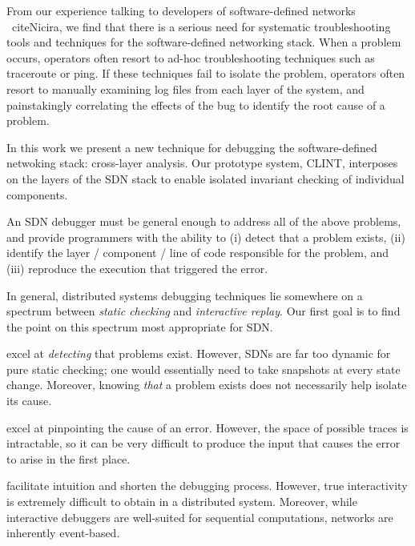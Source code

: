 From our experience talking to developers of software-defined networks
~cite{Nicira}, we find that there is a serious need for systematic troubleshooting
tools and techniques for the software-defined networking stack. When a problem occurs,
operators often resort to ad-hoc troubleshooting techniques such as traceroute or ping.
If these techniques fail to isolate the problem, operators often resort to
manually examining log files from each layer of the system, and painstakingly
correlating the effects of the bug to identify the root cause of a problem.

In this work we present a new technique for debugging the software-defined
netwoking stack: cross-layer analysis. Our prototype system, CLINT, interposes 
on the layers of the SDN stack to enable isolated invariant checking of individual
components.

An SDN debugger must be general enough to address all of the above problems, and provide programmers
with the ability to (i) detect that a problem exists, (ii) identify the layer / component / line of code
responsible for the problem, and (iii) reproduce the execution that triggered the error.

In general, distributed systems debugging techniques lie somewhere on a spectrum between
{\it static checking} and {\it interactive replay}. Our first goal is to find
the point on this spectrum most appropriate for SDN. 

 \cite{anteater} excel at {\it detecting} that problems
exist. However, SDNs are far too dynamic for pure static checking; one would
essentially need to take snapshots at every state change. Moreover,
            knowing {\it that} a problem exists does not necessarily help isolate its
            cause.

             \cite{x-trace} excel at pinpointing the cause of an
            error. However, the space of possible traces is intractable, so it can be very
            difficult to produce the input that causes the error to arise in the first
            place.

             facilitate intuition and shorten the
            debugging process. However, true interactivity is extremely difficult to
            obtain in a distributed system. 
            Moreover, while interactive debuggers are
            well-suited for sequential
            computations, networks are inherently event-based.

